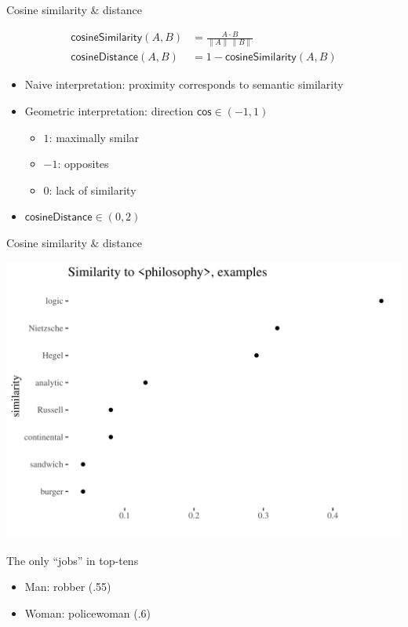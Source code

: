 \documentclass[
  10pt,
  ignorenonframetext,
  x11names, dvipsnames, bibspacing,natbib, table]{beamer}
\providecommand{\tightlist}{%
  \setlength{\itemsep}{0pt}\setlength{\parskip}{0pt}}
\begin{document}
\begin{frame}{Cosine similarity \& distance}
\protect\hypertarget{cosine-similarity-distance}{}
\vspace{-4mm}

\begin{align} \tag{Sim}
\mathsf{cosineSimilarity}(A,B) & = \frac{A \cdot B}{\lVert  A \rVert \,\lVert B \rVert}
\\
\tag{Distance}
\mathsf{cosineDistance}(A,B) &  = 1 - \mathsf{cosineSimilarity}(A,B)
\end{align}

\begin{itemize}
\item
  Naive interpretation: proximity corresponds to semantic similarity
\item
  Geometric interpretation: direction \(\mathsf{cos} \in (-1,1)\)

  \begin{itemize}
  \tightlist
  \item
    \(1\): maximally smilar
  \item
    \(-1\): opposites
  \item
    \(0\): lack of similarity
  \end{itemize}
\item
  \(\mathsf{cosineDistance}\in (0, 2)\)
\end{itemize}
\end{frame}

\begin{frame}{Cosine similarity \& distance}
\protect\hypertarget{cosine-similarity-distance-1}{}
\begin{center}\includegraphics[width=0.8\linewidth]{presentationBoston_files/figure-beamer/philosophy-1} \end{center}

\pause

\begin{block}{The only ``jobs'' in top-tens}
\protect\hypertarget{the-only-jobs-in-top-tens}{}
\begin{itemize}
\item
  Man: robber (.55)
\item
  Woman: policewoman (.6)
\end{itemize}
\end{block}
\end{frame}
\end{document}
